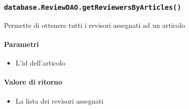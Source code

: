 \subsubsection{\texttt{database.ReviewDAO.getReviewersByArticles()}}
Permette di ottenere tutti i revisori assegnati ad un articolo
\paragraph{Parametri}
\begin{itemize}
\item L'id dell'articolo
\end{itemize}
\paragraph{Valore di ritorno}
\begin{itemize}
\item La lista dei revisori assegnati
\end{itemize}
    
